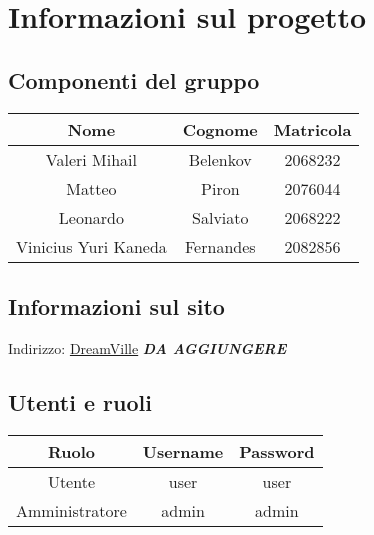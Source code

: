 \section{Informazioni sul progetto}
\subsection{Componenti del gruppo}

\begin{table}[H]
    \centering
    \begin{tabular}{|c|c|c|}
        \hline
        \cellcolor[HTML]{FFCC00} \textbf{Nome} & \cellcolor[HTML]{FFCC00} \textbf{Cognome} & \cellcolor[HTML]{FFCC00} \textbf{Matricola}  \\ 
        \hline
        Valeri Mihail & Belenkov & 2068232 \\ 
        \hline
        Matteo & Piron & 2076044\\ 
        \hline
        Leonardo & Salviato & 	2068222  \\ 
        \hline
        Vinicius Yuri Kaneda & Fernandes & 	2082856 \\ 
        \hline
    \end{tabular}
\end{table}

\subsection{Informazioni sul sito}
Indirizzo: \href{https://www.lipsum.com/}{DreamVille} \textbf{\textit{DA AGGIUNGERE}}

\subsection{Utenti e ruoli}
\begin{table}[H]
    \centering
    \begin{tabular}{|c|c|c|}
        \hline
        \cellcolor[HTML]{FFCC00} \textbf{Ruolo} & \cellcolor[HTML]{FFCC00} \textbf{Username} & \cellcolor[HTML]{FFCC00} \textbf{Password}       \\ 
        \hline
        Utente & user & user \\ 
        \hline
        Amministratore & admin & admin\\ 
        \hline
    \end{tabular}
\end{table}
